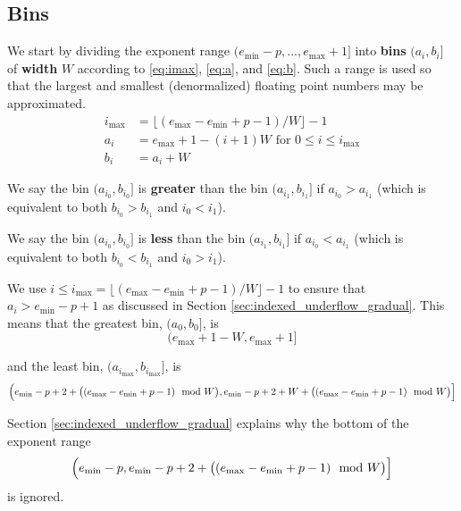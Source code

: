     \subsection{Bins}
    \label{sec:binning_bins}
    We start by dividing the exponent range $(e_{\min} - p, ..., e_{\max} + 1]$
    into \textbf{bins} $(a_i, b_i]$ of \textbf{width} $W$ according to
    \eqref{eq:imax}, \eqref{eq:a}, and \eqref{eq:b}. Such a range is used so
    that the largest and smallest (denormalized) floating point numbers may be
    approximated.
    \begin{align}
        i_{\max} & = \bigl\lfloor(e_{\max} - e_{\min} + p - 1)/W\bigr\rfloor - 1
            \label{eq:imax} \\
        a_i & = e_{\max} + 1 - (i + 1)W \text{ for } 0 \leq i \leq i_{\max}
            \label{eq:a} \\
        b_i & = a_i + W
            \label{eq:b}
    \end{align}

    We say the bin $(a_{i_0}, b_{i_0}]$ is \textbf{greater} than the bin
    $(a_{i_1}, b_{i_1}]$ if $a_{i_0} > a_{i_1}$ (which is equivalent to both
    $b_{i_0} > b_{i_1}$ and $i_0 < i_1$).

    We say the bin $(a_{i_0}, b_{i_0}]$ is \textbf{less} than the bin
    $(a_{i_1}, b_{i_1}]$ if $a_{i_0} < a_{i_1}$ (which is equivalent to both
    $b_{i_0} < b_{i_1}$ and $i_0 > i_1$).

    We use $i \leq i_{\max} = \lfloor(e_{\max} - e_{\min} + p - 1)/W\rfloor - 1$
    to ensure that $a_i > e_{\min} - p + 1$ as discussed in Section
    \ref{sec:indexed_underflow_gradual}. This means that the greatest bin,
    $(a_{0}, b_{0}]$, is
    \begin{equation}
      (e_{\max} + 1 - W, e_{\max} + 1]
      \label{eq:binmax}
    \end{equation}

    and the least bin, $(a_{i_{\max}}, b_{i_{\max}}]$, is
    \begin{equation}
      \Bigl(e_{\min} - p + 2 + \bigl((e_{\max} - e_{\min} + p - 1)\mod W\bigr),
      e_{\min} - p + 2 + W + \bigl((e_{\max} - e_{\min} + p - 1)\mod W\bigr)\Bigr]
      \label{eq:binmin}
    \end{equation}

    Section \ref{sec:indexed_underflow_gradual} explains why the bottom of the exponent range
    \begin{equation*}
    \Bigl(e_{\min} - p, e_{\min} - p + 2 + \bigl((e_{\max} - e_{\min} + p - 1) \mod W\bigr)\Bigr]
    \end{equation*}
    is ignored.

